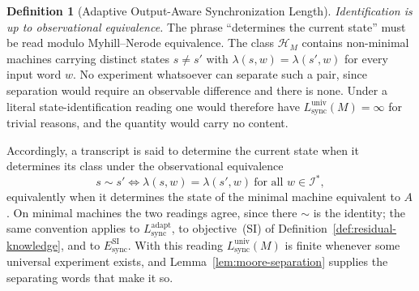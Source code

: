\documentclass[12pt]{article}
\theoremstyle{definition}
\newtheorem{definition}[theorem]{Definition}
\newcommand{\Lsync}{L_{\mathrm{sync}}^{\mathrm{adapt}}}
\newcommand{\Lsyncu}{L_{\mathrm{sync}}^{\mathrm{univ}}}
\newcommand{\EsyncSI}{E_{\mathrm{sync}}^{\mathrm{SI}}}
\begin{document}
\begin{definition}[Adaptive Output-Aware Synchronization Length]
\emph{Identification is up to observational equivalence.}  The phrase
``determines the current state'' must be read modulo Myhill--Nerode
equivalence.  The class $\mathcal H_M$ contains
non-minimal machines carrying distinct states $s\ne s'$ with
$\lambda(s,w)=\lambda(s',w)$ for every input word $w$.  No experiment whatsoever
can separate such a pair, since separation would require an observable
difference and there is none.  Under a literal state-identification reading one
would therefore have $\Lsyncu(M)=\infty$ for trivial reasons, and the quantity
would carry no content.

Accordingly, a transcript is said to determine the current state when it
determines its class under the observational equivalence
\[
s\sim s'
\iff
\lambda(s,w)=\lambda(s',w)\ \text{for all }w\in\mathcal I^*,
\]
equivalently when it determines the state of the minimal machine equivalent to
$A$.  On minimal machines the two readings agree, since there $\sim$ is the
identity; the same convention applies to $\Lsync$, to objective~(SI) of
Definition~\ref{def:residual-knowledge}, and to $\EsyncSI$.  With this reading
$\Lsyncu(M)$ is finite whenever some universal experiment exists, and
Lemma~\ref{lem:moore-separation} supplies the separating words that make it so.
\end{definition}
\end{document}
